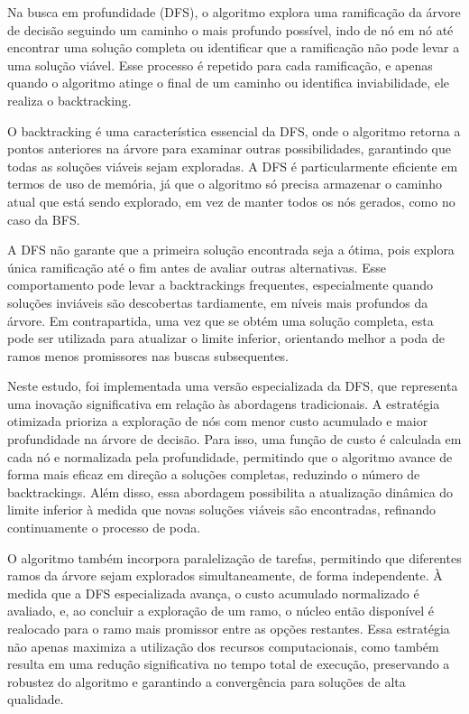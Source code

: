 \documentclass[12pt,a4paper,oneside,linenumbers=off,latinmodern=off,timesnews=off,english,spanish]{rctart-class/rctart}
\begin{document}
Na busca em profundidade (DFS), o algoritmo explora uma ramificação da árvore de decisão seguindo um caminho o mais profundo possível, indo de nó em nó até encontrar uma solução completa ou identificar que a ramificação não pode levar a uma solução viável. Esse processo é repetido para cada ramificação, e apenas quando o algoritmo atinge o final de um caminho ou identifica inviabilidade, ele realiza o backtracking.

O backtracking é uma característica essencial da DFS, onde o algoritmo retorna a pontos anteriores na árvore para examinar outras possibilidades, garantindo que todas as soluções viáveis sejam exploradas. A DFS é particularmente eficiente em termos de uso de memória, já que o algoritmo só precisa armazenar o caminho atual que está sendo explorado, em vez de manter todos os nós gerados, como no caso da BFS.

A DFS não garante que a primeira solução encontrada seja a ótima, pois explora única ramificação até o fim antes de avaliar outras alternativas. Esse comportamento pode levar a backtrackings frequentes, especialmente quando soluções inviáveis são descobertas tardiamente, em níveis mais profundos da árvore. Em contrapartida, uma vez que se obtém uma solução completa, esta pode ser utilizada para atualizar o limite inferior, orientando melhor a poda de ramos menos promissores nas buscas subsequentes.

Neste estudo, foi implementada uma versão especializada da DFS, que representa uma inovação significativa em relação às abordagens tradicionais. A estratégia otimizada prioriza a exploração de nós com menor custo acumulado e maior profundidade na árvore de decisão. Para isso, uma função de custo é calculada em cada nó e normalizada pela profundidade, permitindo que o algoritmo avance de forma mais eficaz em direção a soluções completas, reduzindo o número de backtrackings. Além disso, essa abordagem possibilita a atualização dinâmica do limite inferior à medida que novas soluções viáveis são encontradas, refinando continuamente o processo de poda. 

O algoritmo também incorpora paralelização de tarefas, permitindo que diferentes ramos da árvore sejam explorados simultaneamente, de forma independente. À medida que a DFS especializada avança, o custo acumulado normalizado é avaliado, e, ao concluir a exploração de um ramo, o núcleo então disponível é realocado para o ramo mais promissor entre as opções restantes. Essa estratégia não apenas maximiza a utilização dos recursos computacionais, como também resulta em uma redução significativa no tempo total de execução, preservando a robustez do algoritmo e garantindo a convergência para soluções de alta qualidade.
\end{document}
